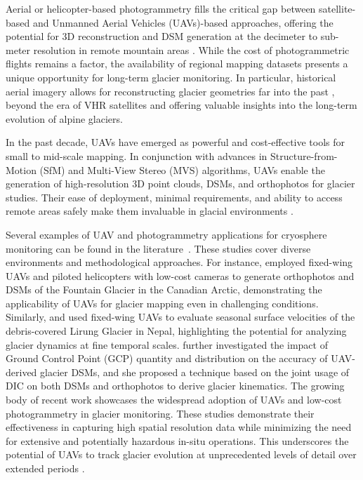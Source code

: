 Aerial or helicopter-based photogrammetry fills the critical gap between satellite-based and Unmanned Aerial Vehicles (UAVs)-based approaches, offering the potential for 3D reconstruction and DSM generation at the decimeter to sub-meter resolution in remote mountain areas \citep{poli2020use}. 
While the cost of photogrammetric flights remains a factor, the availability of regional mapping datasets presents a unique opportunity for long-term glacier monitoring.
In particular, historical aerial imagery allows for reconstructing glacier geometries far into the past \citep{Degaetani2021}, beyond the era of VHR satellites and offering valuable insights into the long-term evolution of alpine glaciers.

In the past decade, UAVs have emerged as powerful and cost-effective tools for small to mid-scale mapping.
In conjunction with advances in Structure-from-Motion (SfM) \citep{Westoby2012} and Multi-View Stereo (MVS) \citep{Seitz2006} algorithms,  UAVs enable the generation of high-resolution 3D point clouds, DSMs, and orthophotos for glacier studies. 
Their ease of deployment, minimal requirements, and ability to access remote areas safely make them invaluable in glacial environments \citep{immerzeel2014, Chudley2019, ioli2021mid}. 

Several examples of UAV and photogrammetry applications for cryosphere monitoring can be found in the literature~\citep{Bhardwaj2016, Gaffey2020}.
These studies cover diverse environments and methodological approaches.
For instance, \citet{Whitehead2013} employed fixed-wing UAVs and piloted helicopters with low-cost cameras to generate orthophotos and DSMs of the Fountain Glacier in the Canadian Arctic, demonstrating the applicability of UAVs for glacier mapping even in challenging conditions. 
Similarly, \citet{immerzeel2014} and \citet{kraaijenbrink2016} used fixed-wing UAVs to evaluate seasonal surface velocities of the debris-covered Lirung Glacier in Nepal, highlighting the potential for analyzing glacier dynamics at fine temporal scales.
\citet{Gindraux2017} further investigated the impact of Ground Control Point (GCP) quantity and distribution on the accuracy of UAV-derived glacier DSMs, and she proposed a technique based on the joint usage of DIC on both DSMs and orthophotos to derive glacier kinematics.
The growing body of recent work \citep{Benoit2019, Chudley2019, Jouvet2020, Cao2021,  ioli2021mid, Lamsters2022, belloni2023} showcases the widespread adoption of UAVs and low-cost photogrammetry in glacier monitoring. 
These studies demonstrate their effectiveness in capturing high spatial resolution data while minimizing the need for extensive and potentially hazardous in-situ operations.
This underscores the potential of UAVs to track glacier evolution at unprecedented levels of detail over extended periods \citep{ioli2021mid, belloni2023}.

